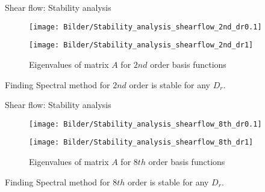 \begin{frame}{Shear flow: Stability analysis}
	\begin{figure}
		\centering
		\begin{minipage}{0.4\linewidth}
			\texttt{[image: Bilder/Stability\_analysis\_shearflow\_2nd\_dr0.1]}
		\end{minipage}
		\hspace{1cm}
		\begin{minipage}{0.4\linewidth}
			\centering
			\texttt{[image: Bilder/Stability\_analysis\_shearflow\_2nd\_dr1]}
		\end{minipage}
		\caption{Eigenvalues of matrix $A$ for $2nd$ order basis functions}
	\end{figure}
	
	\begin{block}{Finding}
		Spectral method for $2nd$ order is stable for any $D_r$.
	\end{block}
\end{frame}

\begin{frame}{Shear flow: Stability analysis}
	\begin{figure}
		\centering
		\begin{minipage}{0.4\linewidth}
			\texttt{[image: Bilder/Stability\_analysis\_shearflow\_8th\_dr0.1]}
		\end{minipage}
		\hspace{1cm}
		\begin{minipage}{0.4\linewidth}
			\centering
			\texttt{[image: Bilder/Stability\_analysis\_shearflow\_8th\_dr1]}
		\end{minipage}
		\caption{Eigenvalues of matrix $A$ for $8th$ order basis functions}
	\end{figure}
	
	\begin{block}{Finding}
		Spectral method for $8th$ order is stable for any $D_r$.
	\end{block}
\end{frame}






